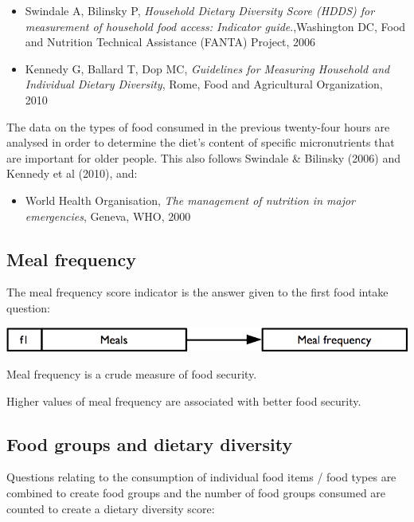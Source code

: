 \documentclass[12pt,a4paper]{book}
\providecommand{\tightlist}{%
  \setlength{\itemsep}{0pt}\setlength{\parskip}{0pt}}
\theoremstyle{definition}
\theoremstyle{definition}
\theoremstyle{definition}
\theoremstyle{remark}
\begin{document}
\begin{itemize}
\item
  Swindale A, Bilinsky P, \emph{Household Dietary Diversity Score (HDDS)
  for measurement of household food access: Indicator guide}.,Washington
  DC, Food and Nutrition Technical Assistance (FANTA) Project, 2006
\item
  Kennedy G, Ballard T, Dop MC, \emph{Guidelines for Measuring Household
  and Individual Dietary Diversity}, Rome, Food and Agricultural
  Organization, 2010
\end{itemize}

The data on the types of food consumed in the previous twenty-four hours
are analysed in order to determine the diet's content of specific
micronutrients that are important for older people. This also follows
Swindale \& Bilinsky (2006) and Kennedy et al (2010), and:

\begin{itemize}
\tightlist
\item
  World Health Organisation, \emph{The management of nutrition in major
  emergencies}, Geneva, WHO, 2000
\end{itemize}

\hypertarget{meal-frequency}{%
\subsection{Meal frequency}\label{meal-frequency}}

The meal frequency score indicator is the answer given to the first food
intake question:

\begin{center}\includegraphics[width=800pt]{figures/indicators05} \end{center}

Meal frequency is a crude measure of food security.

Higher values of meal frequency are associated with better food
security.

\hypertarget{food-groups-and-dietary-diversity}{%
\subsection{Food groups and dietary
diversity}\label{food-groups-and-dietary-diversity}}

Questions relating to the consumption of individual food items / food
types are combined to create food groups and the number of food groups
consumed are counted to create a dietary diversity score:
\end{document}
